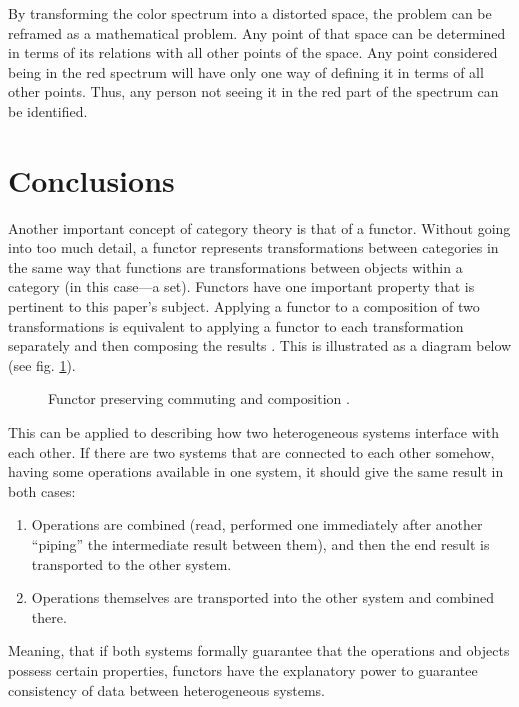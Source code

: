 \documentclass{article}
\begin{document}
By transforming the color spectrum into a distorted space, the problem can be reframed as
a mathematical problem. Any point of that space can be determined in terms of its relations with
all other points of the space. Any point considered being in the red spectrum will have only one
way of defining it in terms of all other points. Thus, any person not seeing it in the red part of the
spectrum can be identified.

\section*{Conclusions}

Another important concept of category theory is that of a functor. Without going into too
much detail, a functor represents transformations between categories in the same way that
functions are transformations between objects within a category (in this case---a set). Functors
have one important property that is pertinent to this paper’s subject. Applying a functor to a
composition of two transformations is equivalent to applying a functor to each transformation
separately and then composing the results \cite{Ahrens}. This is illustrated as a diagram below (see fig. \ref{funct}).

\begin{figure}[h]
    \begin{center}
        
    \end{center}
    \caption{Functor preserving commuting and composition \cite{Ahrens}.}
    \label{funct}
\end{figure}

This can be applied to describing how two heterogeneous systems interface with each other.
If there are two systems that are connected to each other somehow, having some operations
available in one system, it should give the same result in both cases:
\begin{enumerate}[*]
    \item Operations are combined (read, performed one immediately after another “piping” the
    intermediate result between them), and then the end result is transported to the other
    system.
    \item Operations themselves are transported into the other system and combined there.
\end{enumerate}
Meaning, that if both systems formally guarantee that the operations and objects possess
certain properties, functors have the explanatory power to guarantee consistency of data between
heterogeneous systems.
\end{document}
